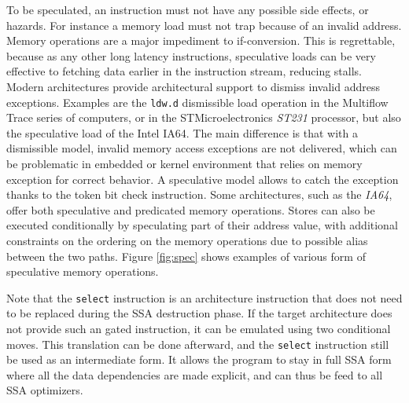 To be speculated, an instruction must not have any possible side effects, or hazards. For instance a memory load must not trap because of an invalid address. 
Memory operations are  a major impediment to if-conversion. This is regrettable, because as any other long latency instructions, speculative loads can be very effective to fetching data earlier in the instruction stream, reducing stalls. Modern architectures provide architectural support to dismiss invalid address exceptions. Examples are the \texttt{ldw.d} dismissible load operation in the Multiflow Trace series of computers, or in the STMicroelectronics \textit{ST231} processor, but also the speculative load of the Intel IA64. The main difference is that with a dismissible model, invalid memory access exceptions are not delivered, which can be problematic in embedded or kernel environment that relies on memory exception for correct behavior. A speculative model allows to catch the exception thanks to the token bit check instruction. Some architectures, such as the \textit{IA64}, offer both speculative and predicated memory operations.
%
Stores can also be executed conditionally by speculating part of their address value, with additional constraints on the ordering on the memory operations due to possible alias between the two paths. Figure \ref{fig:spec} shows examples of various form of speculative memory operations.

Note that the \texttt{select} instruction is an architecture instruction that does not need to be replaced during the SSA destruction phase. If the target architecture does not provide such an gated instruction, it can be emulated using two conditional moves. This translation can be done afterward, and the \texttt{select} instruction still be used as an intermediate form. It allows the program to stay in full SSA form where all the data dependencies are made explicit, and can thus be feed to all SSA optimizers. 

